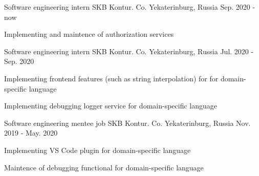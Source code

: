 

\begin{cventries}

  \cventry
    {Software engineering intern} %
    {SKB Kontur. Co.} %
    {Yekaterinburg, Russia} %
    {Sep. 2020 - now} %
    {
      \begin{cvitems} %
        \item {Implementing and maintence of authorization services}
      \end{cvitems}
    }
  \cventry
    {Software engineering intern} %
    {SKB Kontur. Co.} %
    {Yekaterinburg, Russia} %
    {Jul. 2020 - Sep. 2020} %
      {
        \begin{cvitems} %
          \item {Implementing frontend features (such as string interpolation) for for domain-specific language}
          \item {Implementing debugging logger service for domain-specific language}
        \end{cvitems}
      }
  \cventry
    {Software engineering mentee job} %
    {SKB Kontur. Co.} %
    {Yekaterinburg, Russia} %
    {Nov. 2019 - May. 2020} %
      {
      \begin{cvitems} %
        \item {Implementing VS Code plugin for domain-specific language}
        \item {Maintence of debugging functional for domain-specific language}
      \end{cvitems}
      }
\end{cventries}
